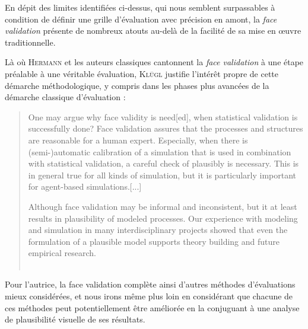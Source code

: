 En dépit des limites identifiées ci-dessus, qui nous semblent surpassables à condition de définir une grille d'évaluation avec précision en amont, la \textit{face validation} présente de nombreux atouts au-delà de la facilité de sa mise en œuvre traditionnelle.

Là où H\textsc{ermann} et les auteurs classiques cantonnent la \textit{face validation} à une étape préalable à une véritable évaluation, K\textsc{lügl} justifie l'intérêt propre de cette démarche méthodologique, y compris dans les phases plus avancées de la démarche classique d'évaluation :

\begin{quotation}
	\noindent \og One may argue why face validity is need[ed], when statistical validation is successfully done?
	Face validation assures that the processes and structures are reasonable for a human expert.
	Especially, when there is (semi-)automatic calibration of a simulation that is used in combination with statistical validation, a careful check of plausibly is necessary.
	This is in general true for all kinds of simulation, but it is particularly important for agent-based simulations.[...]
	
	\noindent Although face validation may be informal and inconsistent, but it at least results in plausibility of modeled processes.
	Our experience with modeling and simulation in many interdisciplinary projects showed that even the formulation of a plausible model supports theory building and future empirical research.\fg{}\\
	\mbox{}~ \hfill \textcite[40;43]{klugl_validation_2008}
\end{quotation}


Pour l'autrice, la face validation complète ainsi d'autres méthodes d'évaluations mieux considérées, et nous irons même plus loin en considérant que chacune de ces méthodes peut potentiellement être améliorée en la conjuguant à une analyse de plausibilité visuelle de ses résultats.


